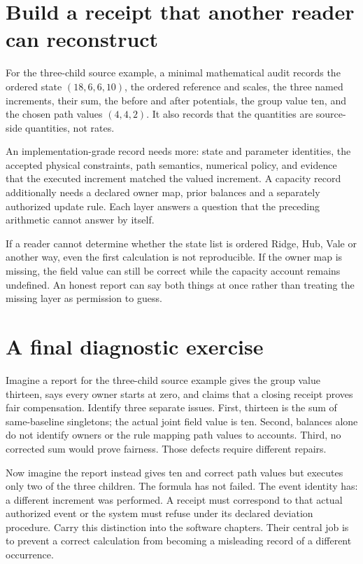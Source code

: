 \section{Build a receipt that another reader can reconstruct}
For the three-child source example, a minimal mathematical audit records
the ordered state $(18,6,6,10)$, the ordered reference and scales,
the three named increments, their sum, the before and after potentials,
the group value ten, and the chosen path values $(4,4,2)$. It also
records that the quantities are source-side quantities, not rates.

An implementation-grade record needs more: state and parameter identities,
the accepted physical constraints, path semantics, numerical policy,
and evidence that the executed increment matched the valued increment.
A capacity record additionally needs a declared owner map, prior balances
and a separately authorized update rule. Each layer answers a question
that the preceding arithmetic cannot answer by itself.

If a reader cannot determine whether the state list is ordered Ridge,
Hub, Vale or another way, even the first calculation is not reproducible.
If the owner map is missing, the field value can still be correct while
the capacity account remains undefined. An honest report can say both
things at once rather than treating the missing layer as permission to
guess.

\section{A final diagnostic exercise}
Imagine a report for the three-child source example gives the group
value thirteen, says every owner starts at zero, and claims that a
closing receipt proves fair compensation. Identify three separate issues.
First, thirteen is the sum of same-baseline singletons; the actual joint
field value is ten. Second, balances alone do not identify owners or the
rule mapping path values to accounts. Third, no corrected sum would prove
fairness. Those defects require different repairs.

Now imagine the report instead gives ten and correct path values but
executes only two of the three children. The formula has not failed.
The event identity has: a different increment was performed. A receipt
must correspond to that actual authorized event or the system must refuse
under its declared deviation procedure. Carry this distinction into the
software chapters. Their central job is to prevent a correct calculation
from becoming a misleading record of a different occurrence.


